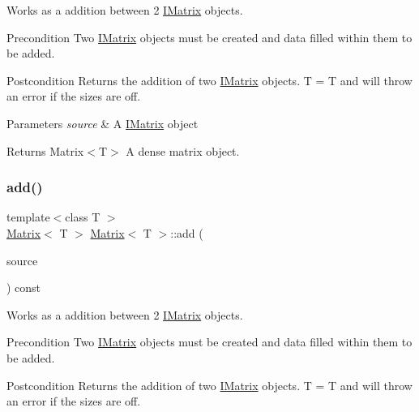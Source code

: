 Works as a addition between 2 \mbox{\hyperlink{class_i_matrix}{I\+Matrix}} objects. 

\begin{DoxyPrecond}{Precondition}
Two \mbox{\hyperlink{class_i_matrix}{I\+Matrix}} objects must be created and data filled within them to be added. 
\end{DoxyPrecond}
\begin{DoxyPostcond}{Postcondition}
Returns the addition of two \mbox{\hyperlink{class_i_matrix}{I\+Matrix}} objects. T = T and will throw an error if the sizes are off.
\end{DoxyPostcond}

\begin{DoxyParams}{Parameters}
{\em source} & A \mbox{\hyperlink{class_i_matrix}{I\+Matrix}} object \\
\hline
\end{DoxyParams}
\begin{DoxyReturn}{Returns}
Matrix$<$\+T$>$ A dense matrix object. 
\end{DoxyReturn}
\mbox{\label{class_matrix_ae9fddaf07917b365eacca00df05d4db5}} 
\subsubsection{\texorpdfstring{add()}{add()}\hspace{0.1cm}{\footnotesize\ttfamily [3/6]}}
{\footnotesize\ttfamily template$<$class T $>$ \\
\mbox{\hyperlink{class_matrix}{Matrix}}$<$ T $>$ \mbox{\hyperlink{class_matrix}{Matrix}}$<$ T $>$\+::add (\begin{DoxyParamCaption}\item[{const \mbox{\hyperlink{class_i_matrix}{I\+Matrix}}$<$ \mbox{\hyperlink{class_l_matrix}{L\+Matrix}}$<$ T $>$, T $>$ \&}]{source }\end{DoxyParamCaption}) const}



Works as a addition between 2 \mbox{\hyperlink{class_i_matrix}{I\+Matrix}} objects. 

\begin{DoxyPrecond}{Precondition}
Two \mbox{\hyperlink{class_i_matrix}{I\+Matrix}} objects must be created and data filled within them to be added. 
\end{DoxyPrecond}
\begin{DoxyPostcond}{Postcondition}
Returns the addition of two \mbox{\hyperlink{class_i_matrix}{I\+Matrix}} objects. T = T and will throw an error if the sizes are off.
\end{DoxyPostcond}

